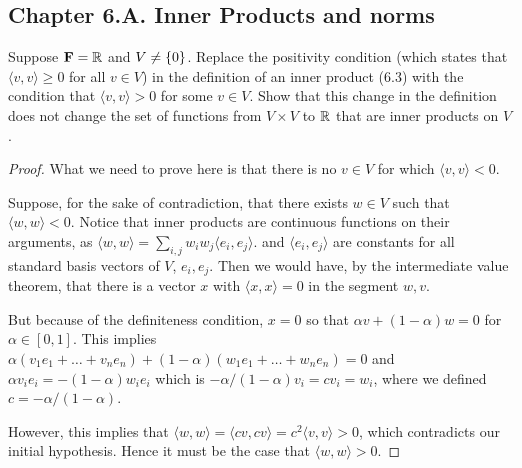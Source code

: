 \subsection*{Chapter 6.A. Inner Products and norms}


\begin{exercise}{3}
  Suppose $\mathbf{F}=\mathbb{R}$ and $V\neq\{0\}$. Replace the positivity condition (which states that $\langle v, v\rangle\geq 0$ for all $v\in V$) in the definition of an inner product (6.3) with the condition that $\langle v, v\rangle>0$ for some $v\in V$. Show that this change in the definition does not change the set of functions from $V\times V$ to $\mathbb{R}$ that are inner products on $V$.
\end{exercise}
\begin{proof}
 What we need to prove here is that there is no $v\in V$ for which $\langle v, v\rangle<0$. 
 
 Suppose, for the sake of contradiction, that there exists $w\in V$ such that $\langle w, w\rangle<0$. Notice that inner products are continuous functions on their arguments, as $\langle w,w\rangle =\sum_{i,j}w_iw_j\langle e_i, e_j\rangle$. and $\langle e_i,e_j\rangle$ are constants for all standard basis vectors  of $V$, $e_i,e_j$. Then we would have, by the intermediate value theorem, that there is a vector $x$ with $\langle x,x\rangle =0$ in the segment $w,v$. 
 
 But because of the definiteness condition, $x=0$ so that $\alpha v +(1-\alpha) w=0$ for $\alpha\in [0,1]$. This implies $\alpha(v_1e_1+\dots+v_ne_n)+(1-\alpha)(w_1e_1+\dots+w_ne_n)=0$ and $\alpha v_ie_i=-(1-\alpha)w_ie_i$ which is $-\alpha/(1-\alpha)v_i=cv_i=w_i$, where we defined $c=-\alpha/(1-\alpha)$.

 However, this implies that $\langle w,w\rangle = \langle cv,cv\rangle = c^2\langle v,v\rangle > 0$, which contradicts our initial hypothesis. Hence it must be the case that $\langle w,w\rangle>0$.
\end{proof}

